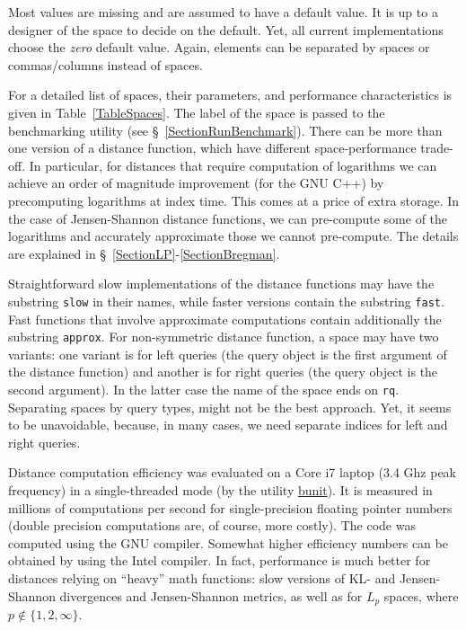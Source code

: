 \documentclass[runningheads,a4paper]{llncs}
\newcommand{\ttt}[1]{\texttt{#1}}
\begin{document}
{Most values are missing and are assumed to have a default value.
It is up to a designer of the space to decide on the default.
Yet, all current implementations choose the \emph{zero} default value.
Again, elements can be separated by spaces or commas/columns instead of spaces.

For a detailed list of spaces, their parameters, 
and performance characteristics is given in Table~\ref{TableSpaces}.
The label of the space is passed to the benchmarking utility (see \S~\ref{SectionRunBenchmark}).
There can be more than one version of a distance function,
which have different space-performance trade-off.
In particular, for distances that require computation of logarithms 
we can achieve an order of magnitude improvement (for the GNU C++) by precomputing
logarithms at index time. This comes at a price of extra storage. 
In the case of Jensen-Shannon distance functions, we can pre-compute some 
of the logarithms and accurately approximate those we cannot pre-compute.
The details are explained in \S~\ref{SectionLP}-\ref{SectionBregman}.

Straightforward slow implementations of the distance functions may have the substring \ttt{slow}
in their names, while faster versions contain the substring \ttt{fast}.
Fast functions that involve approximate computations contain additionally the substring \ttt{approx}.
For non-symmetric distance function, a space may have two variants: one variant is for left
queries (the query object is the first argument of the distance function) 
and another is for right queries (the query object is the second argument).
In the latter case the name of the space ends on \texttt{rq}.
Separating spaces by query types, might not be the best approach.
Yet, it seems to be unavoidable, because, in many cases,
we need separate indices for left and right queries.

Distance computation efficiency was evaluated on a Core i7 laptop (3.4 Ghz peak frequency)
in a single-threaded mode (by the utility \href{https://github.com/searchivarius/NonMetricSpaceLib/blob/master/similarity_search/test/bunit.cc}{bunit}).
It is measured in millions of computations per second for single-precision
floating pointer numbers (double precision computations are, of course, more costly). 
The code was computed using the GNU compiler. 
Somewhat higher efficiency numbers can be obtained by using the Intel compiler.
In fact, performance is much better for distances relying on ``heavy'' math functions:
slow versions of KL- and Jensen-Shannon divergences and Jensen-Shannon metrics, 
as well as for $L_p$ spaces,
where $p \not\in\{1,2,\infty\}$.

}
\end{document}
